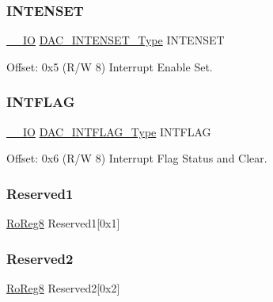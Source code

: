 \subsubsection{\texorpdfstring{INTENSET}{INTENSET}}
{\footnotesize\ttfamily \mbox{\hyperlink{core__cm0plus_8h_aec43007d9998a0a0e01faede4133d6be}{\+\_\+\+\_\+\+IO}} \mbox{\hyperlink{union_d_a_c___i_n_t_e_n_s_e_t___type}{D\+A\+C\+\_\+\+I\+N\+T\+E\+N\+S\+E\+T\+\_\+\+Type}} I\+N\+T\+E\+N\+S\+ET}



Offset\+: 0x5 (R/W 8) Interrupt Enable Set. 

\mbox{\label{struct_dac_ab4496ba3ffab30aef60ba2dce5e689ac}} 
\subsubsection{\texorpdfstring{INTFLAG}{INTFLAG}}
{\footnotesize\ttfamily \mbox{\hyperlink{core__cm0plus_8h_aec43007d9998a0a0e01faede4133d6be}{\+\_\+\+\_\+\+IO}} \mbox{\hyperlink{union_d_a_c___i_n_t_f_l_a_g___type}{D\+A\+C\+\_\+\+I\+N\+T\+F\+L\+A\+G\+\_\+\+Type}} I\+N\+T\+F\+L\+AG}



Offset\+: 0x6 (R/W 8) Interrupt Flag Status and Clear. 

\mbox{\label{struct_dac_a092866123ac46d0985136e4dca2f36f4}} 
\subsubsection{\texorpdfstring{Reserved1}{Reserved1}}
{\footnotesize\ttfamily \mbox{\hyperlink{group___s_a_m_d21_e15_a__definitions_ga0d957f1433aaf5d70e4dc2b68288442d}{Ro\+Reg8}} Reserved1\mbox{[}0x1\mbox{]}}

\mbox{\label{struct_dac_a39c013121a741bab8d9442a891da19a7}} 
\subsubsection{\texorpdfstring{Reserved2}{Reserved2}}
{\footnotesize\ttfamily \mbox{\hyperlink{group___s_a_m_d21_e15_a__definitions_ga0d957f1433aaf5d70e4dc2b68288442d}{Ro\+Reg8}} Reserved2\mbox{[}0x2\mbox{]}}

